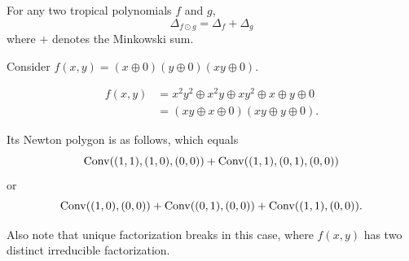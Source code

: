 \documentclass[../../main.tex]{subfiles}
\begin{document}
\begin{prop}
    For any two tropical polynomials $f$ and $g$,
    \[\Delta_{f\odot g}=\Delta_f+\Delta_g\]
    where $+$ denotes the Minkowski sum.
\end{prop}

\begin{example}
    Consider $f(x,y)=(x\oplus 0)(y\oplus 0)(xy\oplus 0)$.

    \begin{align*}
        f(x,y) &= x^2y^2 \oplus x^2y \oplus xy^2\oplus x\oplus y\oplus 0\\
        &= (xy\oplus x\oplus 0)(xy\oplus y\oplus 0).
    \end{align*}

    Its Newton polygon is as follows, which equals
    \[\operatorname{Conv}((1,1),(1,0),(0,0))+\operatorname{Conv}((1,1),(0,1),(0,0))\]
    or
    \[\operatorname{Conv}((1,0),(0,0))+\operatorname{Conv}((0,1),(0,0))+\operatorname{Conv}((1,1),(0,0)).\]
    
    Also note that unique factorization breaks in this case, where $f(x,y)$ has two distinct irreducible factorization.

    \NewtonPolygonFigure
\end{example}
\end{document}
